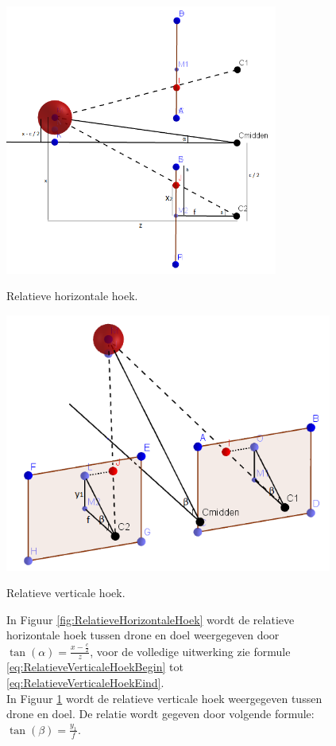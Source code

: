 \begin{figure}[h]
	\centering
	\begin{minipage}{.45\textwidth}
		\centering
		\includegraphics[width=0.8\textwidth]{RelatieveHorizontaleHoek.png}
		\caption{Relatieve horizontale hoek.}
		\label{fig:RelatieveHorizontaleHoek}
	\end{minipage}
	\begin{minipage}{.45\textwidth}
		\centering
		\includegraphics[width=0.96\textwidth]{RelatieveVerticaleHoek.png}
		\caption{Relatieve verticale hoek.}
		\label{fig:RelatieveVerticaleHoek}
	\end{minipage}%
	\caption*{In Figuur \ref{fig:RelatieveHorizontaleHoek} wordt de relatieve horizontale hoek tussen drone en doel weergegeven door \(\tan(\alpha) = \frac{x-\frac{c}{2}}{z}\), voor de volledige uitwerking zie formule \ref{eq:RelatieveVerticaleHoekBegin} tot \ref{eq:RelatieveVerticaleHoekEind}.\\
		In Figuur \ref{fig:RelatieveVerticaleHoek} wordt de relatieve verticale hoek weergegeven tussen drone en doel. De relatie wordt gegeven door volgende formule: \(\tan(\beta) = \frac{y_1}{f}\).}
\end{figure}
